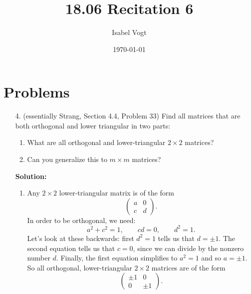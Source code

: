 \documentclass[11pt]{article}
\title{18.06 Recitation 6}
\author{Isabel Vogt}
\date{\today}                                           %
\begin{document}
\maketitle
\section{Problems}

\begin{enumerate}

\item[4.] (essentially Strang, Section 4.4, Problem 33) Find all matrices that are both orthogonal and lower triangular in two parts:
\begin{enumerate}
\item What are all orthogonal and lower-triangular $2\times 2$ matrices?
\item Can you generalize this to $m\times m$ matrices?
\end{enumerate}

\textbf{Solution:} 
\begin{enumerate}

\item Any $2\times 2 $ lower-triangular matrix is of the form
\[\begin{pmatrix} a & 0 \\ c & d \end{pmatrix}. \] 
In order to be orthogonal, we need:
\[a^2 + c^2 = 1, \qquad cd = 0, \qquad d^2 = 1. \]
Let's look at these backwards: first $d^2 = 1$ tells us that $d = \pm 1$.  The second equation tells us that $c = 0$, since we can divide by the nonzero number $d$.  Finally, the first equation simplifies to $a^2 = 1$ and so $a = \pm 1$.
So all orthogonal, lower-triangular $2 \times 2$ matrices are of the form
\[\begin{pmatrix} \pm 1 & 0 \\ 0 & \pm 1 \end{pmatrix}. \]


\end{enumerate}
\end{enumerate}
\end{document}
